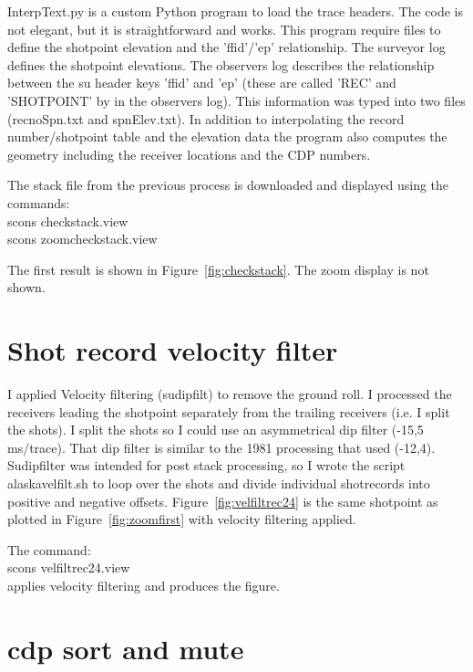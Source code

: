 InterpText.py is a custom Python program to load the trace headers.  The
code is not elegant, but it is straightforward and works.  This program 
require files to define the shotpoint elevation and the 'ffid'/'ep' 
relationship.  The surveyor log defines the shotpoint elevations.  The 
observers log describes the relationship between the su header keys 
'ffid' and 'ep' (these are called 'REC' and 'SHOTPOINT' by in the observers 
log).  This information was typed into two files (recnoSpn.txt and 
spnElev.txt).  In addition to interpolating the record number/shotpoint 
table and the elevation data the program also computes the geometry 
including the receiver locations and the CDP numbers.

The stack file from the previous process is downloaded and displayed 
using the commands: \\
scons checkstack.view \\
scons zoomcheckstack.view

The first result is shown in Figure~\ref{fig:checkstack}.  The zoom display
is not shown.


\section{Shot record velocity filter}
I applied Velocity filtering (sudipfilt) to remove the ground roll.
I processed the receivers leading the shotpoint separately from the
trailing receivers (i.e. I split the shots).  I split the shots so I 
could use an asymmetrical dip filter (-15,5 ms/trace).  That dip filter 
is similar to the 1981 processing that used (-12,4). Sudipfilter was 
intended for post stack processing, so I wrote the script alaskavelfilt.sh 
to loop over the shots and divide individual shotrecords into positive 
and negative offsets.  Figure~\ref{fig:velfiltrec24} is the same shotpoint 
as plotted in Figure~\ref{fig:zoomfirst} with velocity filtering applied.

The command:\\
scons velfiltrec24.view \\
applies velocity filtering and produces the figure.


\section{cdp sort and mute}

